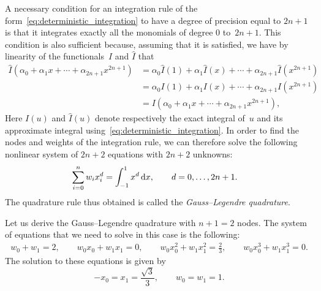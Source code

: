 A necessary condition for an integration rule of the form~\eqref{eq:deterministic_integration} to have a degree of precision
equal to $2 n +1$ is that it integrates exactly all the monomials of degree $0$ to~$2 n+1$.
This condition is also sufficient because,
assuming that it is satisfied,
we have by linearity of the functionals~$I$ and $\widehat I$ that
\begin{align*}
    \widehat I\left(\alpha_0 + \alpha_1 x + \dotsb + \alpha_{2n+1} x^{2n+1}\right)
    &= \alpha_0 \widehat I(1) + \alpha_1 \widehat I(x) + \dotsb + \alpha_{2n+1} \widehat I\left(x^{2n+1}\right) \\
    &= \alpha_0 I(1) + \alpha_1 I(x) + \dotsb + \alpha_{2n+1} I\left(x^{2n+1}\right) \\
    &= I\left(\alpha_0 + \alpha_1 x + \dotsb + \alpha_{2n+1} x^{2n+1}\right),
\end{align*}
Here $I(u)$ and $\widehat I(u)$ denote respectively the exact integral of~$u$ and its approximate integral using~\eqref{eq:deterministic_integration}.
In order to find the nodes and weights of the integration rule,
we can therefore solve the following nonlinear system of $2n+2$ equations with $2n+2$ unknowns:
\begin{align}
    \label{eq:system_gauss_legendre}
    \sum_{i=0}^{n} w_i x_i^{d} &= \int_{-1}^{1} x^d \, \mathrm d x, \qquad d = 0, \dotsc, 2n+1.
\end{align}
The quadrature rule thus obtained is called the \emph{Gauss--Legendre quadrature}.
\begin{example}
Let us derive the Gauss--Legendre quadrature with $n + 1 = 2$ nodes.
The system of equations that we need to solve in this case is the following:
\begin{align*}
    w_0 + w_1 = 2,
    \qquad w_0 x_0 + w_1 x_1 = 0,
    \qquad w_0 x_0^2 + w_1 x_1^2 = \frac{2}{3},
    \qquad w_0 x_0^3 + w_1 x_1^3 = 0.
\end{align*}
The solution to these equations is given by
\[
    - x_0 = x_1 = \frac{\sqrt{3}}{3}, \qquad w_0 = w_1 = 1.
\]
\end{example}

